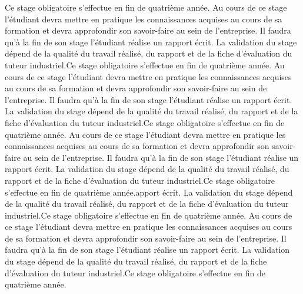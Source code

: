 Ce stage obligatoire s'effectue en fin de quatrième année. Au cours de ce stage l'étudiant devra mettre en pratique les connaissances acquises au cours de sa formation et devra approfondir son savoir-faire au sein de l'entreprise. Il faudra qu'à  la fin de son stage l'étudiant réalise un rapport écrit. La validation du stage dépend de la qualité du travail réalisé, du rapport et de la fiche d'évaluation du tuteur industriel.Ce stage obligatoire s'effectue en fin de quatrième année. Au cours de ce stage l'étudiant devra mettre en pratique les connaissances acquises au cours de sa formation et devra approfondir son savoir-faire au sein de l'entreprise. Il faudra qu'à  la fin de son stage l'étudiant réalise un rapport écrit. La validation du stage dépend de la qualité du travail réalisé, du rapport et de la fiche d'évaluation du tuteur industriel.Ce stage obligatoire s'effectue en fin de quatrième année. Au cours de ce stage l'étudiant devra mettre en pratique les connaissances acquises au cours de sa formation et devra approfondir son savoir-faire au sein de l'entreprise. Il faudra qu'à  la fin de son stage l'étudiant réalise un rapport écrit. La validation du stage dépend de la qualité du travail réalisé, du rapport et de la fiche d'évaluation du tuteur industriel.Ce stage obligatoire s'effectue en fin de quatrième année.apport écrit. La validation du stage dépend de la qualité du travail réalisé, du rapport et de la fiche d'évaluation du tuteur industriel.Ce stage obligatoire s'effectue en fin de quatrième année. Au cours de ce stage l'étudiant devra mettre en pratique les connaissances acquises au cours de sa formation et devra approfondir son savoir-faire au sein de l'entreprise. Il faudra qu'à  la fin de son stage l'étudiant réalise un rapport écrit. La validation du stage dépend de la qualité du travail réalisé, du rapport et de la fiche d'évaluation du tuteur industriel.Ce stage obligatoire s'effectue en fin de quatrième année.